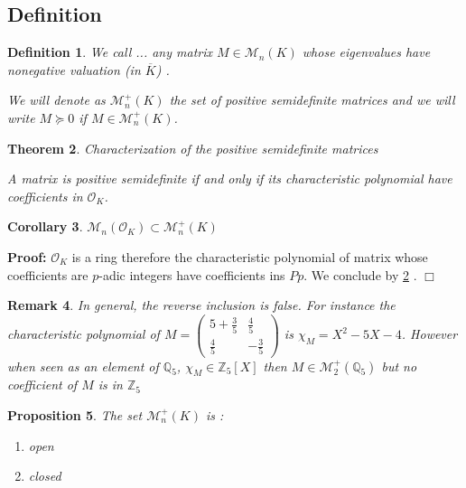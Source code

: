 \documentclass[a4paper,12pt]{article}
\newenvironment{proof}{\hbox{}\vspace{-0.5cm} {\bf Proof:}}{\hfill $\Box$ \\}
\newtheorem{theorem}{Theorem}[section]
\newtheorem{proposition}[theorem]{Proposition}
\newtheorem{corollary}[theorem]{Corollary}
\newtheorem{definition}[theorem]{Definition}
\newtheorem{remark}[theorem]{Remark}
\newcommand{\OK}{\mathcal{O}_K}
\begin{document}
\subsection{Definition}
\newcommand\Mat{Positive semidefinite matrix }
\newcommand\mats{positive semidefinite matrices }
\newcommand\Mats{positive semidefinite matrices }
\begin{definition}
	We call ... any matrix $M \in \mathcal{M}_n\left( K \right) $ whose eigenvalues have nonegative valuation (in $\overline{K}$) .
	
	We will denote as $ \mathcal{M}_n^+\left( K \right)$ the set of \mats and we will write $M \succeq 0$ if $M \in \mathcal{M}_n^+\left( K\right) $.
\end{definition}
\begin{theorem}
	\label{caracsdp}
	Characterization of the \mats
	
	A matrix is positive semidefinite if and only if its characteristic polynomial have coefficients in $\OK$.
	
\end{theorem}


\begin{corollary}
	$\mathcal{M}_n(\OK) \subset \mathcal{M}_n^+\left( K \right)$ 
\end{corollary}

\begin{proof}
$\OK$ is a ring therefore the characteristic polynomial of matrix whose coefficients are $p$-adic integers have coefficients ins $Pp$. We conclude by \ref{caracsdp} .
\end{proof}



\begin{remark}
	In general, the reverse inclusion is false. For instance the characteristic polynomial of $M = \begin{pmatrix} 5 + \frac{3}{5} & \frac{4}{5} \\ \frac{4}{5} & -\frac{3}{5} \end{pmatrix} $ is $\chi_M = X^2  - 5 X - 4$. However when seen as an element of $\mathbb{Q}_5$, $\chi_M \in \mathbb{Z}_5[X]$ then $M \in \mathcal{M}_2^+\left( \mathbb{Q}_5 \right)$ but no coefficient of $M$ is in $\mathbb{Z}_5 $
\end{remark}

\begin{proposition}
	The set $\mathcal{M}_n^+\left( K \right)$ is :
	\begin{enumerate}%
		\item open
		\item closed
	\end{enumerate}
\end{proposition}
\end{document}
